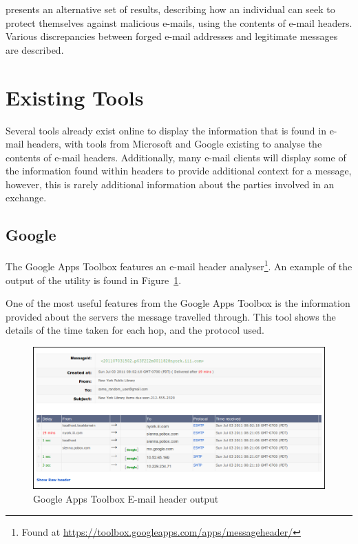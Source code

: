 \cite{Al-zarouni_tracinge-mail} presents an alternative set of results,
describing how an individual can seek to protect themselves against malicious
e-mails, using the contents of e-mail headers.  Various discrepancies between
forged e-mail addresses and legitimate messages are described.

\section{Existing Tools}

Several tools already exist online to display the information that is found in
e-mail headers, with tools from Microsoft and Google existing to analyse the
contents of e-mail headers. Additionally, many e-mail clients will display some
of the information found within headers to provide additional context for a
message, however, this is rarely additional information about the parties
involved in an exchange.

\subsection{Google}\label{sec:goo}

The Google Apps Toolbox features an e-mail header analyser\footnote{Found at
	\url{https://toolbox.googleapps.com/apps/messageheader/}}. An example
of the output of the utility is found in Figure~\ref{fig:goo}.

One of the most useful features from the Google Apps Toolbox is the information
provided about the servers the message travelled through.  This tool shows the
details of the time taken for each hop, and the protocol used.

\begin{figure}[ht] \centering
\includegraphics[width=0.9\linewidth]{google-header}
\caption{Google Apps Toolbox E-mail header output} \label{fig:goo}\end{figure}

